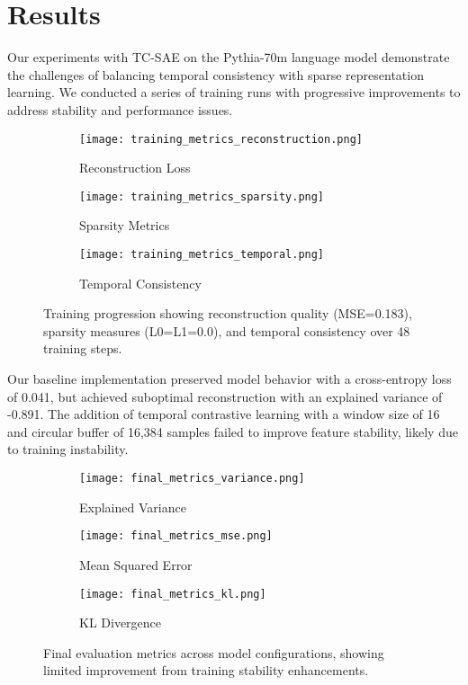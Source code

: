 \documentclass{article} %
\begin{document}
\section{Results}
\label{sec:results}

Our experiments with TC-SAE on the Pythia-70m language model demonstrate the challenges of balancing temporal consistency with sparse representation learning. We conducted a series of training runs with progressive improvements to address stability and performance issues.

\begin{figure}[h]
    \centering
    \begin{subfigure}{0.32\textwidth}
        \texttt{[image: training\_metrics\_reconstruction.png]}
        \caption{Reconstruction Loss}
        \label{fig:recon_loss}
    \end{subfigure}
    \hfill
    \begin{subfigure}{0.32\textwidth}
        \texttt{[image: training\_metrics\_sparsity.png]}
        \caption{Sparsity Metrics}
        \label{fig:sparsity_metrics}
    \end{subfigure}
    \hfill
    \begin{subfigure}{0.32\textwidth}
        \texttt{[image: training\_metrics\_temporal.png]}
        \caption{Temporal Consistency}
        \label{fig:temporal_metrics}
    \end{subfigure}
    \caption{Training progression showing reconstruction quality (MSE=0.183), sparsity measures (L0=L1=0.0), and temporal consistency over 48 training steps.}
    \label{fig:training_metrics}
\end{figure}

Our baseline implementation preserved model behavior with a cross-entropy loss of 0.041, but achieved suboptimal reconstruction with an explained variance of -0.891. The addition of temporal contrastive learning with a window size of 16 and circular buffer of 16,384 samples failed to improve feature stability, likely due to training instability.

\begin{figure}[h]
    \centering
    \begin{subfigure}{0.32\textwidth}
        \texttt{[image: final\_metrics\_variance.png]}
        \caption{Explained Variance}
        \label{fig:final_variance}
    \end{subfigure}
    \hfill
    \begin{subfigure}{0.32\textwidth}
        \texttt{[image: final\_metrics\_mse.png]}
        \caption{Mean Squared Error}
        \label{fig:final_mse}
    \end{subfigure}
    \hfill
    \begin{subfigure}{0.32\textwidth}
        \texttt{[image: final\_metrics\_kl.png]}
        \caption{KL Divergence}
        \label{fig:final_kl}
    \end{subfigure}
    \caption{Final evaluation metrics across model configurations, showing limited improvement from training stability enhancements.}
    \label{fig:final_metrics}
\end{figure}
\end{document}
